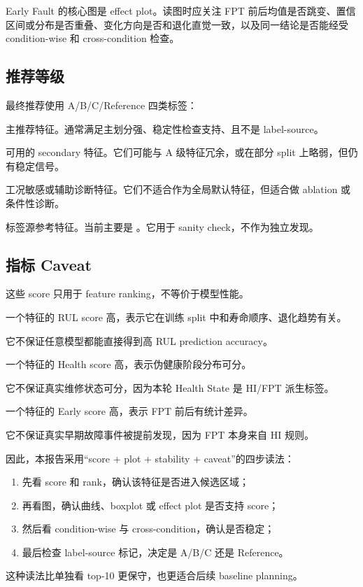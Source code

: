 Early Fault 的核心图是 effect plot。读图时应关注 FPT 前后均值是否跳变、置信区间或分布是否重叠、变化方向是否和退化直觉一致，以及同一结论是否能经受 condition-wise 和 cross-condition 检查。

\subsection{推荐等级}

最终推荐使用 A/B/C/Reference 四类标签：

\begin{description}[leftmargin=2.4em,style=nextline]
  \item[A]
  主推荐特征。通常满足主划分强、稳定性检查支持、且不是 label-source。

  \item[B]
  可用的 secondary 特征。它们可能与 A 级特征冗余，或在部分 split 上略弱，但仍有稳定信号。

  \item[C]
  工况敏感或辅助诊断特征。它们不适合作为全局默认特征，但适合做 ablation 或条件性诊断。

  \item[Reference]
  标签源参考特征。当前主要是 。它用于 sanity check，不作为独立发现。
\end{description}

\subsection{指标 Caveat}

这些 score 只用于 feature ranking，不等价于模型性能。

一个特征的 RUL score 高，表示它在训练 split 中和寿命顺序、退化趋势有关。

它不保证任意模型都能直接得到高 RUL prediction accuracy。

一个特征的 Health score 高，表示伪健康阶段分布可分。

它不保证真实维修状态可分，因为本轮 Health State 是 HI/FPT 派生标签。

一个特征的 Early score 高，表示 FPT 前后有统计差异。

它不保证真实早期故障事件被提前发现，因为 FPT 本身来自 HI 规则。

因此，本报告采用“score + plot + stability + caveat”的四步读法：

\begin{enumerate}[leftmargin=2em]
  \item 先看 score 和 rank，确认该特征是否进入候选区域；
  \item 再看图，确认曲线、boxplot 或 effect plot 是否支持 score；
  \item 然后看 condition-wise 与 cross-condition，确认是否稳定；
  \item 最后检查 label-source 标记，决定是 A/B/C 还是 Reference。
\end{enumerate}

这种读法比单独看 top-10 更保守，也更适合后续 baseline planning。


